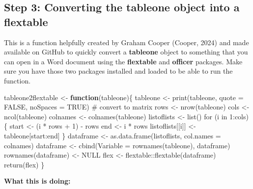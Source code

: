 \documentclass[
  letterpaper,
  DIV=11,
  numbers=noendperiod]{scrreprt}
\newenvironment{Shaded}{\begin{snugshade}}{\end{snugshade}}
\newcommand{\AttributeTok}[1]{\textcolor[rgb]{0.40,0.45,0.13}{#1}}
\newcommand{\CommentTok}[1]{\textcolor[rgb]{0.37,0.37,0.37}{#1}}
\newcommand{\ConstantTok}[1]{\textcolor[rgb]{0.56,0.35,0.01}{#1}}
\newcommand{\ControlFlowTok}[1]{\textcolor[rgb]{0.00,0.23,0.31}{\textbf{#1}}}
\newcommand{\FunctionTok}[1]{\textcolor[rgb]{0.28,0.35,0.67}{#1}}
\newcommand{\NormalTok}[1]{\textcolor[rgb]{0.00,0.23,0.31}{#1}}
\newcommand{\OtherTok}[1]{\textcolor[rgb]{0.00,0.23,0.31}{#1}}
\begin{document}
\subsection{Step 3: Converting the tableone object into a
flextable}\label{step-3-converting-the-tableone-object-into-a-flextable}

This is a function helpfully created by Graham Cooper (Cooper, 2024) and
made available on GitHub to quickly convert a \textbf{tableone} object
to something that you can open in a Word document using the
\textbf{flextable} and \textbf{officer} packages. Make sure you have
those two packages installed and loaded to be able to run the function.

\begin{Shaded}
\begin{Highlighting}[]
\NormalTok{tableone2flextable }\OtherTok{\textless{}{-}} \ControlFlowTok{function}\NormalTok{(tableone)\{   tableone }\OtherTok{\textless{}{-}} \FunctionTok{print}\NormalTok{(tableone, }\AttributeTok{quote =} \ConstantTok{FALSE}\NormalTok{, }\AttributeTok{noSpaces =} \ConstantTok{TRUE}\NormalTok{)  }\CommentTok{\# convert to matrix      rows \textless{}{-} nrow(tableone)   cols \textless{}{-} ncol(tableone)   colnames \textless{}{-} colnames(tableone)      listoflists \textless{}{-} list()      for (i in 1:cols)\{     start \textless{}{-} (i * rows + 1) {-} rows     end \textless{}{-} i * rows     listoflists[[i]] \textless{}{-} tableone[start:end]   \}      dataframe \textless{}{-} as.data.frame(listoflists, col.names = colnames)   dataframe \textless{}{-} cbind(Variable = rownames(tableone), dataframe)     rownames(dataframe) \textless{}{-} NULL                                        flex \textless{}{-} flextable::flextable(dataframe)      return(flex) \}}
\end{Highlighting}
\end{Shaded}

\textbf{What this is doing:}
\end{document}
